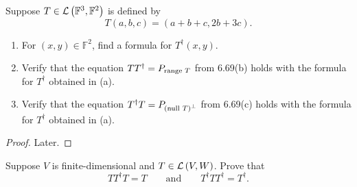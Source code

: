 \begin{exercise}
    Suppose $T\in\mathcal{L}\left({\mathbb{F}^{3}, \mathbb{F}^{2}}\right)$ is defined by
    \[
        T(a, b, c) = (a + b + c, 2b + 3c).
    \]
    \begin{enumerate}[label={(\alph*)}]
        \item For $(x, y)\in\mathbb{F}^{2}$, find a formula for $T^{\dagger}(x, y)$.
        \item Verify that the equation $TT^{\dagger} = P_{\operatorname{range}\,{T}}$ from 6.69(b) holds with the formula for $T^{\dagger}$ obtained in (a).
        \item Verify that the equation $T^{\dagger}T = P_{{(\operatorname{null}\,{T})}^{\bot}}$ from 6.69(c) holds with the formula for $T^{\dagger}$ obtained in (a).
    \end{enumerate}
\end{exercise}

\begin{proof}
    Later.
\end{proof}
\newpage

\begin{exercise}
    Suppose $V$ is finite-dimensional and $T\in\mathcal{L}\left({V, W}\right)$. Prove that
    \[
        TT^{\dagger}T = T\qquad\text{and}\qquad T^{\dagger}TT^{\dagger} = T^{\dagger}.
    \]
\end{exercise}

